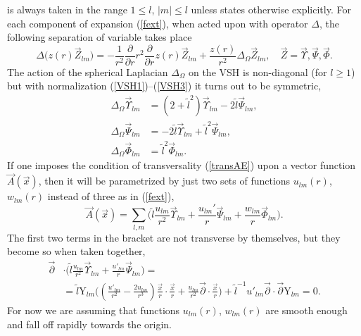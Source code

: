 \documentclass[12pt]{article}
\newcommand{\pl}{\partial}
\newcommand{\plr}{\partial r}
\newcommand{\Dtph}{\Delta_{\Omega}}
\newcommand{\YY}{\mathrm{Y}}
\begin{document}
	is always taken in the range
$ 1 \leq l $, 
$ |m| \leq l $
	unless states otherwise explicitly.
	For each component of expansion
(\ref{fext}),
	when acted upon with operator
$ \Delta $,
	the following separation of variable takes place
\begin{equation*}
    \Delta \bigl(z(r) \vec{Z}_{lm}\bigr) =
-\frac{1}{r^{2}} \frac{\pl}{\plr} r^{2} \frac{\pl}{\plr} z(r) \vec{Z}_{lm}
        + \frac{z(r)}{r^{2}} \Dtph \vec{Z}_{lm}, \quad
            \vec{Z} = \vec{\Upsilon}, \vec{\Psi}, \vec{\Phi} .
\end{equation*}
	The action of the spherical Laplacian
$ \Dtph $
	on the VSH is non-diagonal (for
$ l \geq 1 $)
	but with normalization
(\ref{VSH1})--(\ref{VSH3})
	it turns out to be symmetric,
\begin{align*}
    \Dtph \vec{\Upsilon}_{lm} &= (2+\tilde{l}^{2}) \vec{\Upsilon}_{lm}
            - 2 \tilde{l} \vec{\Psi}_{lm} ,\\
                  \Dtph \vec{\Psi}_{lm} &= -2 \tilde{l}
\vec{\Upsilon}_{lm}
            + \tilde{l}^{2} \vec{\Psi}_{lm} ,\\
    \Dtph \vec{\Phi}_{lm} &= \tilde{l}^{2} \vec{\Phi}_{lm} .
\end{align*}
	If one imposes the condition of transversality
(\ref{transAE})
	upon a vector function
$ \vec{A}(\vec{x}) $,
	then it will be parametrized by just two sets of functions
$ u_{lm}(r) $,
$ w_{lm}(r) $
	instead of three as in 
(\ref{fext}),
\begin{equation}
\label{Atrexp}
    \vec{A}(\vec{x}) =
        \sum_{l,m} \bigl(\tilde{l}
	    \frac{u_{lm}}{r^{2}} \vec{\Upsilon}_{lm} +
        \frac{u_{lm}'}{r} \vec{\Psi}_{lm} 
    +   \frac{w_{lm}}{r} \vec{\Phi}_{lm} \bigr) .
\end{equation}
	The first two terms in the bracket are not transverse by themselves,
	but they become so when taken together,
\begin{align}
\label{treq}
    \vec{\pl} &\cdot
\bigl(\tilde{l}\frac{u_{lm}}{r^{2}}\vec{\Upsilon}_{lm}
        +\frac{u'_{lm}}{r}\vec{\Psi}_{lm}\bigr) =\\
\nonumber
    &= \tilde{l} \YY_{lm}
        \bigl( (\frac{u'_{lm}}{r^{2}}-\frac{2u_{lm}}{r^{3}})
        \frac{\vec{x}}{r}\cdot\frac{\vec{x}}{r} 
    + \frac{u_{lm}}{r^{2}} \vec{\pl}\cdot \frac{\vec{x}}{r} \bigr) 
    + \tilde{l}^{-1} u'_{lm} \vec{\pl}\cdot\vec{\pl} \YY_{lm} = 0 .
\end{align}
	For now we are assuming that functions
$ u_{lm}(r) $,
$ w_{lm}(r) $
	are smooth enough and fall off rapidly towards the origin.
\end{document}
